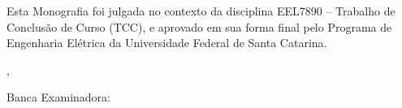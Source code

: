 \pretextual
\imprimircapa

\imprimirfolhaderosto*

\imprimirfichacatalografica


%
% 
%
\begin{folhadeaprovacao}

  \begin{center}
    {\imprimirautor}
    \vspace*{\fill}\vspace*{\fill}
    \begin{center}
      \ABNTEXchapterfont\bfseries\Large\imprimirtitulo
    \end{center}
    \vspace*{\fill}
	    
    
    	\begin{center}
    		\vspace*{0.5cm}
    		Esta Monografia foi julgada no contexto da disciplina EEL7890 -- Trabalho de Conclusão de Curso (TCC), e aprovado em sua forma final pelo Programa de Engenharia Elétrica da Universidade Federal de Santa Catarina.
    		\vspace*{0.5cm}
	 		\end{center}
	    
    \vspace*{\fill}
   \end{center}
  
  \begin{center}
    {\large\imprimirlocal},
    {\large\imprimirdata}
	\end{center}
	        
   Banca Examinadora:
	      

\end{folhadeaprovacao}

